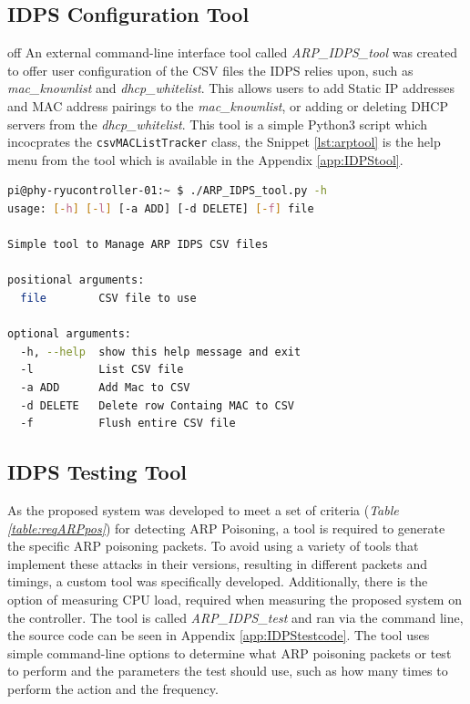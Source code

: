 \documentclass[12pt, oneside]{book}
\begin{document}
\subsection{IDPS Configuration Tool}
\label{subsec:idpsconfig}off
An external command-line interface tool called \emph{ARP\_IDPS\_tool} was created to offer user 
configuration of the CSV files the IDPS
relies upon, such as \emph{mac\_knownlist} and \emph{dhcp\_whitelist}. This allows users to add Static IP addresses
and MAC address pairings to the \emph{mac\_knownlist}, or adding or deleting DHCP servers from the \emph{dhcp\_whitelist}.
This tool is a simple Python3 script 
which incocprates the \lstinline{csvMACListTracker} class, the Snippet \ref{lst:arptool} is the help menu 
from the tool which is available in the Appendix \ref{app:IDPStool}.

\begin{lstlisting}[language=Bash,caption={ARP\_IDPS\_Tool Help Menu},captionpos=b,label={lst:arptool}]
pi@phy-ryucontroller-01:~ $ ./ARP_IDPS_tool.py -h
usage: [-h] [-l] [-a ADD] [-d DELETE] [-f] file

Simple tool to Manage ARP IDPS CSV files

positional arguments:
  file        CSV file to use

optional arguments:
  -h, --help  show this help message and exit
  -l          List CSV file
  -a ADD      Add Mac to CSV
  -d DELETE   Delete row Containg MAC to CSV
  -f          Flush entire CSV file
\end{lstlisting}

\subsection{IDPS Testing Tool}
\label{subsec:testingtool}
As the proposed system was developed to meet a set of criteria (\emph{Table \ref{table:reqARPpos}}) for detecting ARP Poisoning,
a tool is required to generate the specific ARP poisoning packets. To avoid using a variety of tools that implement these 
attacks in their versions, resulting in different packets and timings, a custom tool was specifically developed.
Additionally, there is the option of measuring CPU load, required when measuring the proposed system on the controller. 
The tool 
is called \emph{ARP\_IDPS\_test} and ran via the command line, the source code can be seen in Appendix \ref{app:IDPStestcode}.
The tool uses simple command-line options to determine what ARP poisoning packets or test to perform and the parameters the test should use,
such as how many times to perform the action and the frequency.
\end{document}
